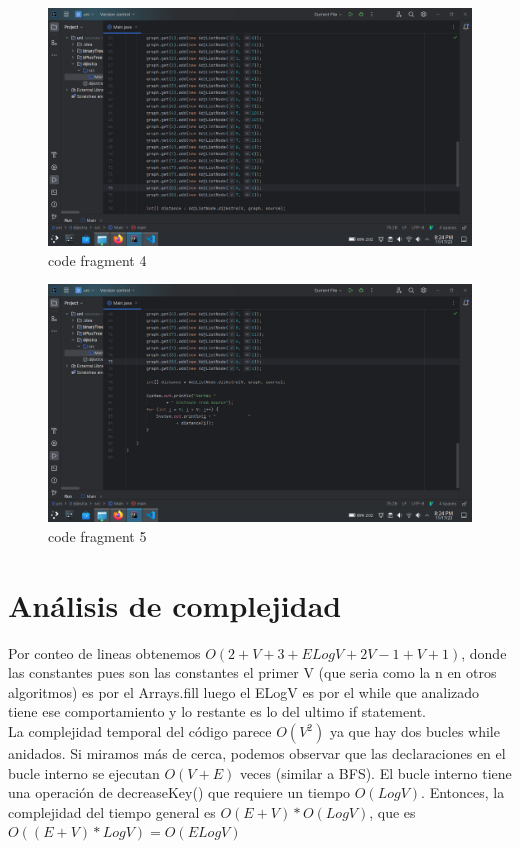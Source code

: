 \documentclass{article}
\begin{document}
\begin{figure}[H]
  \centering
  \includegraphics[scale=0.4]{../imgs/c3.png}
  \caption{code fragment 4}
  \label{fig:4}
\end{figure}

\begin{figure}[H]
  \centering
  \includegraphics[scale=0.4]{../imgs/c4.png}
  \caption{code fragment 5}
  \label{fig:5}
\end{figure}



\section{Análisis de complejidad}
Por conteo de lineas obtenemos $O(2+V+3+ELogV+2V-1+V+1)$, donde las constantes pues son las constantes
el primer V (que seria como la n en otros algoritmos) es por el Arrays.fill
luego el ELogV es por el while que analizado tiene ese comportamiento y lo restante es lo del ultimo if statement. \\
La complejidad temporal del código parece $O(V^2)$
ya que hay dos bucles while anidados. Si miramos más de cerca,
podemos observar que las declaraciones en el bucle interno se ejecutan $O(V+E)$
veces (similar a BFS). El bucle interno tiene una operación de 
 decreaseKey() que requiere un tiempo $O(LogV)$.
 Entonces, la complejidad del tiempo general es $O(E+V)*O(LogV)$, que es $O((E+V)*LogV) = O(ELogV)$
\end{document}

